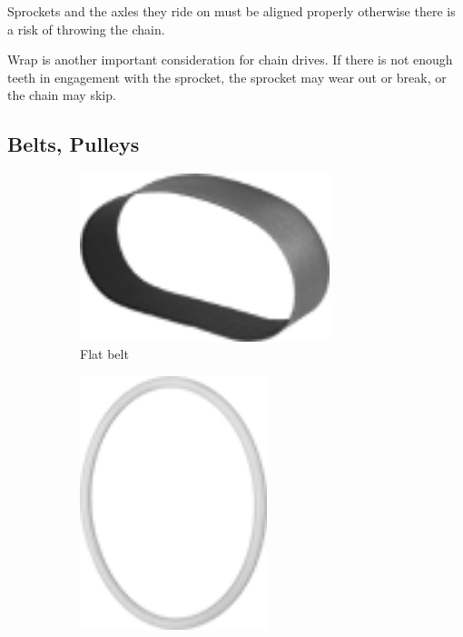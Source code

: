 Sprockets and the axles they ride on must be aligned properly otherwise there is a risk of throwing the chain.

Wrap is another important consideration for chain drives. If there is not enough teeth in engagement with the sprocket, the sprocket may wear out or break, or the chain may skip. 

\newpage
\subsection{Belts, Pulleys}

\begin{figure}[H]
	\begin{subfigure}[b]{.24\linewidth}
		\includegraphics[width=0.8\textwidth]{imgs/belt_flat.png}
		\caption{Flat belt}
	\end{subfigure}\begin{subfigure}[b]{.24\linewidth}
		\includegraphics[width=0.6\textwidth]{imgs/belt_round.png}

\end{subfigure}
\end{figure}
